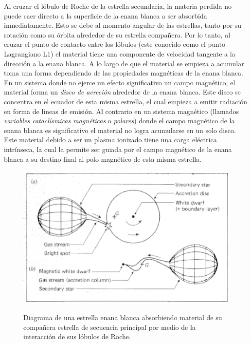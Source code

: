 Al cruzar el lóbulo de Roche de la estrella secundaria, la materia perdida no puede caer directo a la superficie de la enana blanca a ser absorbida inmediatamente. Esto se debe al momento angular de las estrellas, tanto por su rotación como su órbita alrededor de su estrella compañera. Por lo tanto, al cruzar el punto de contacto entre los lóbulos (este conocido como el punto Lagrangiano L1) el material tiene una componente de velocidad tangente a la dirección a la enana blanca. A lo largo de que el material se empieza a acumular toma una forma dependiendo de las propiedades magnéticas de la enana blanca. En un sistema donde no ejerce un efecto significativo un campo magnético, el material forma un \textit{disco de acreción} alrededor de la enana blanca. Este disco se concentra en el ecuador de esta misma estrella, el cual empieza a emitir radiación en forma de líneas de emisión. Al contrario en un sistema magnético (llamados \textit{variables cataclísmicas magnéticas} o \textit{polares}) donde el campo magnético de la enana blanca es significativo el material no logra acumularse en un solo disco. Este material debido a ser un plasma ionizado tiene una carga eléctrica intrínseca, la cual la permite ser guiada por el campo magnético de la enana blanca a su destino final al polo magnético de esta misma estrella. 
\\\newline
\begin{figure}
	\begin{center}
		\includegraphics[scale=0.4]{Introduccion/Figures/Figura Acrecion_SmithReview.png}
	\end{center}

	\begin{center}
		\caption{Diagrama de una estrella enana blanca absorbiendo material de su compañera estrella de secuencia principal por medio de la interacción de sus lóbulos de Roche.} \cite*{smithReview}
	\end{center}
	\label{acrecion_smith_review}
\end{figure}
